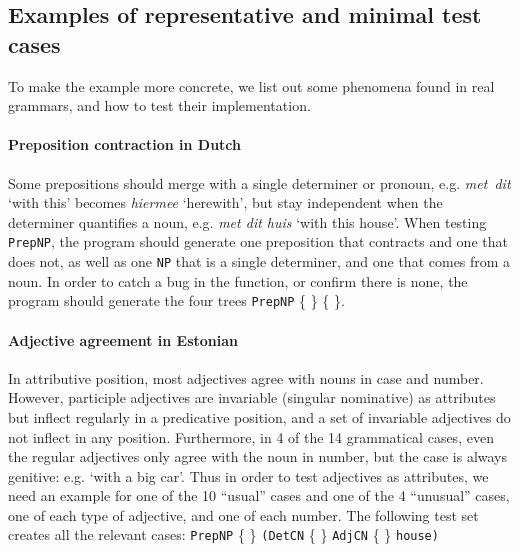 \documentclass[11pt]{article}
\def\t#1{\texttt{#1}}
\begin{document}
\subsection{Examples of representative and minimal test cases} 
To make the example more concrete, we list out some phenomena found in
real grammars, and how to test their implementation. 

\paragraph{Preposition contraction in Dutch} Some prepositions should
merge with a single determiner or pronoun, e.g. \emph{met~dit} `with
this' becomes \emph{hiermee} `herewith', but stay independent when the
determiner quantifies a noun, e.g. \emph{met dit huis} `with this
house'. When testing \t{PrepNP}, the program should generate one
preposition that contracts and one that does not, as well as one
\t{NP} that is a single determiner, and one that comes from a noun.
In order to catch a bug in the function, or confirm there is none, the
program should generate the four trees 
\t{PrepNP} \{  \} 
           \{  \}. 

\paragraph{Adjective agreement in Estonian} In attributive position,
most adjectives agree with nouns in case and number. However,
participle adjectives are invariable (singular nominative) as
attributes but inflect regularly in a predicative position, and a set
of invariable adjectives do not inflect in any position. Furthermore,
in 4 of the 14 grammatical cases, even the regular adjectives only
agree with the noun in number, but the case is always genitive: e.g. 
`with a big car'. 
Thus in order to test adjectives as attributes, we need an example for
one of the 10 ``usual'' cases and one of the 4 ``unusual'' cases, one
of each type of adjective, and one of each number.  
The following test set creates all the relevant cases:
 \t{PrepNP} \{  \}
             {\tt (DetCN} \{  \} 
             {\tt AdjCN}  \{  \} 
             {\tt house)}
\end{document}
